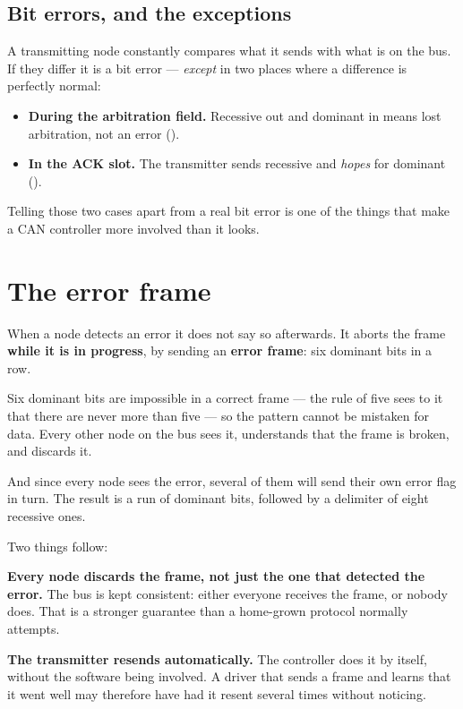 \subsection{Bit errors, and the exceptions}

A transmitting node constantly compares what it sends with what is on the bus. If they differ it is
a bit error --- \emph{except} in two places where a difference is perfectly normal:

\begin{itemize}
  \item \textbf{During the arbitration field.} Recessive out and dominant in means lost
    arbitration, not an error ().
  \item \textbf{In the ACK slot.} The transmitter sends recessive and \emph{hopes} for dominant
    ().
\end{itemize}

Telling those two cases apart from a real bit error is one of the things that make a CAN controller
more involved than it looks.

\section{The error frame}

When a node detects an error it does not say so afterwards. It aborts the frame \textbf{while it is
in progress}, by sending an \textbf{error frame}: six dominant bits in a row.

Six dominant bits are impossible in a correct frame --- the rule of five sees to it that there are
never more than five --- so the pattern cannot be mistaken for data. Every other node on the bus
sees it, understands that the frame is broken, and discards it.

And since every node sees the error, several of them will send their own error flag in turn. The
result is a run of dominant bits, followed by a delimiter of eight recessive ones.

Two things follow:

\textbf{Every node discards the frame, not just the one that detected the error.} The bus is kept
consistent: either everyone receives the frame, or nobody does. That is a stronger guarantee than a
home-grown protocol normally attempts.

\textbf{The transmitter resends automatically.} The controller does it by itself, without the
software being involved. A driver that sends a frame and learns that it went well may therefore have
had it resent several times without noticing.

